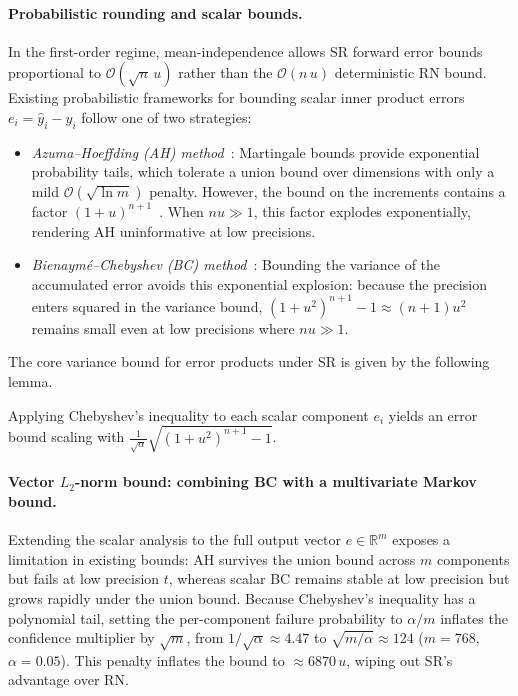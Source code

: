 \paragraph{Probabilistic rounding and scalar bounds.}
In the first-order regime, mean-independence allows SR forward error bounds
proportional to $\mathcal{O}(\sqrt{n} \, u)$ rather than the $\mathcal{O}(n \, u)$
deterministic RN bound. Existing probabilistic frameworks for bounding scalar
inner product errors $e_i = \hat{y}_i - y_i$ follow one of two strategies:
\begin{itemize}[leftmargin=1.5em]
  \item \emph{Azuma--Hoeffding (AH) method}~\citep{connolly2021stochastic,ipsen2020probabilistic,de2025error}:
        Martingale bounds provide exponential probability tails, which tolerate a union bound
        over dimensions with only a mild $\mathcal{O}(\sqrt{\ln m})$ penalty. However, the bound on
        the increments contains a factor $(1 + u)^{n+1}$~\citep[Section~7]{elarar2024bounds}.
        When $nu \gg 1$, this factor explodes exponentially,
        rendering AH uninformative at low precisions.
  \item \emph{Bienaym\'e--Chebyshev (BC) method}~\citep{elarar2022error,elarar2024bounds}:
        Bounding the variance of the accumulated error avoids this exponential explosion:
        because the precision enters squared in the variance bound,
        $(1 + u^2)^{n+1} - 1 \approx (n+1) u^2$ remains small even at low precisions where $nu \gg 1$.
\end{itemize}
The core variance bound for error products under SR is given by the following lemma.


Applying Chebyshev's inequality to each scalar component $e_i$ yields an error bound scaling with $\frac{1}{\sqrt{\alpha}}\sqrt{(1 + u^2)^{n+1} - 1}$.

\paragraph{Vector $L_2$-norm bound: combining BC with a multivariate Markov bound.}
Extending the scalar analysis to the full output vector $e \in \mathbb{R}^m$ exposes a limitation in existing bounds: AH survives the union bound across $m$ components but fails at low precision $t$, whereas scalar BC remains stable at low precision but grows rapidly under the union bound. Because Chebyshev's inequality has a polynomial tail, setting the per-component failure probability to $\alpha / m$ inflates the confidence multiplier by $\sqrt{m}$, from $1/\sqrt{\alpha} \approx 4.47$ to $\sqrt{m/\alpha} \approx 124$ ($m = 768$, $\alpha = 0.05$). This penalty inflates the bound to $\approx 6870 \, u$, wiping out SR's advantage over RN.


